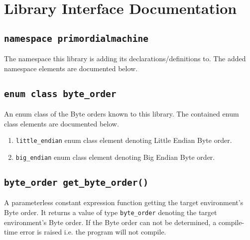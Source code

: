 \documentclass[oneside]{book}
\begin{document}


\section{Library Interface Documentation}
\subsection{\texttt{namespace primordialmachine}}
The namespace this library is adding its declarations/definitions to.
The added namespace elements are documented below.

\subsection{\texttt{enum class byte\_order}}
An enum class of the Byte orders known to this library.
The contained enum class elements are documented below.
\begin{enumerate}
\item \texttt{little\_endian} enum class element denoting Little Endian Byte order.
\item \texttt{big\_endian} enum class element denoting Big Endian Byte order.
\end{enumerate}

\subsection{\texttt{byte\_order get\_byte\_order()}}
A parameterless constant expression function getting the target environment's Byte order. It returns
a value of type \lstinline{byte_order} denoting the target environment's Byte order.     If the Byte
order can not be determined, a compile-time error is raised i.e. the program will not       compile.
\end{document}
